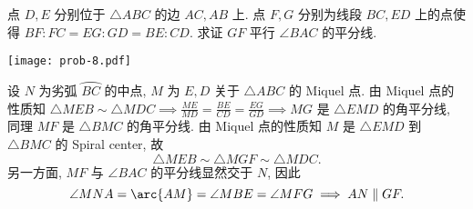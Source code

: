 \begin{prob}
\label{prob:prob-8}
点 $D, E$ 分别位于 $\triangle ABC$ 的边 $AC, AB$ 上.
点 $F, G$ 分别为线段 $BC, ED$ 上的点使得
$BF : FC = EG : GD = BE : CD$. 求证 $GF$ 平行 $\angle BAC$ 的平分线.
\end{prob}

\begin{center}
\texttt{[image: prob-8.pdf]}
\end{center}

\begin{soln}
设 $N$ 为劣弧 $\wideparen{BC}$ 的中点,
$M$ 为 $E, D$ 关于 $\triangle ABC$ 的 Miquel 点.
由 Miquel 点的性质知 $\triangle MEB \sim \triangle MDC \implies
\frac{ME}{MD} = \frac{BE}{CD} = \frac{EG}{GD} \implies MG$
是 $\triangle EMD$ 的角平分线, 同理 $MF$ 是 $\triangle BMC$ 的角平分线.
由 Miquel 点的性质知 $M$ 是 $\triangle EMD$ 到 $\triangle BMC$
的 Spiral center, 故
\[
\triangle MEB \sim \triangle MGF \sim \triangle MDC.
\]
另一方面, $MF$ 与 $\angle BAC$ 的平分线显然交于 $N$, 因此
\[
\angle MNA = \arc{AM} = \angle MBE = \angle MFG \implies AN \parallel GF.
\]
\end{soln}
